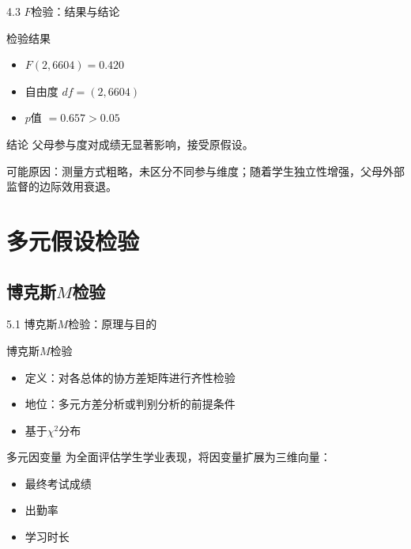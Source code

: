 \documentclass{beamer}
\newenvironment{block*}
  {\setbeamercolor{block title}{bg=white,fg=white}%
   \begin{block}{}}
  {\end{block}}
\begin{document}
\begin{frame}{4.3 \(F\)检验：结果与结论}
    \begin{block}{检验结果}
        \begin{itemize}
            \item \(F(2, 6604) = 0.420\)
            \item 自由度 \(df = (2, 6604)\)
            \item \(p\)值 \(= 0.657 > 0.05\)
        \end{itemize}
    \end{block}

    \vspace{0.5cm}

    \begin{alertblock}{结论}
        父母参与度对成绩无显著影响，接受原假设。
    \end{alertblock}

    \vspace{0.3cm}

    \begin{block*}
        可能原因：测量方式粗略，未区分不同参与维度；随着学生独立性增强，父母外部监督的边际效用衰退。
    \end{block*}
\end{frame}



\section{多元假设检验}

\subsection{博克斯\(M\)检验}
\begin{frame}{5.1 博克斯\(M\)检验：原理与目的}
    \begin{block}{博克斯\(M\)检验}
        \begin{itemize}
            \item 定义：对各总体的协方差矩阵进行齐性检验
            \item 地位：多元方差分析或判别分析的前提条件
            \item 基于\(\chi^2\)分布
        \end{itemize}
    \end{block}

    \vspace{0.5cm}

    \begin{block}{多元因变量}
        为全面评估学生学业表现，将因变量扩展为三维向量：
        \begin{itemize}
            \item 最终考试成绩
            \item 出勤率
            \item 学习时长
        \end{itemize}
    \end{block}
\end{frame}
\end{document}

